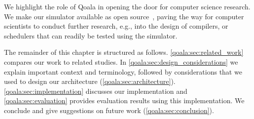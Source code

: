 We highlight the role of Qoala in opening the door for computer science research. We make our simulator available as open source~\cite{qoala2023simulator}, paving the way for computer scientists to conduct further research, e.g., into the design of compilers, or schedulers that can readily be tested using the simulator. 

The remainder of this chapter is structured as follows. \cref{qoala:sec:related_work} compares our work to related studies. In \cref{qoala:sec:design_considerations} we explain important context and terminology, followed by considerations that we used to design our architecture (\cref{qoala:sec:architecture}). \cref{qoala:sec:implementation} discusses our implementation and \cref{qoala:sec:evaluation} provides evaluation results using this implementation. We conclude and give suggestions on future work (\cref{qoala:sec:conclusion}).


